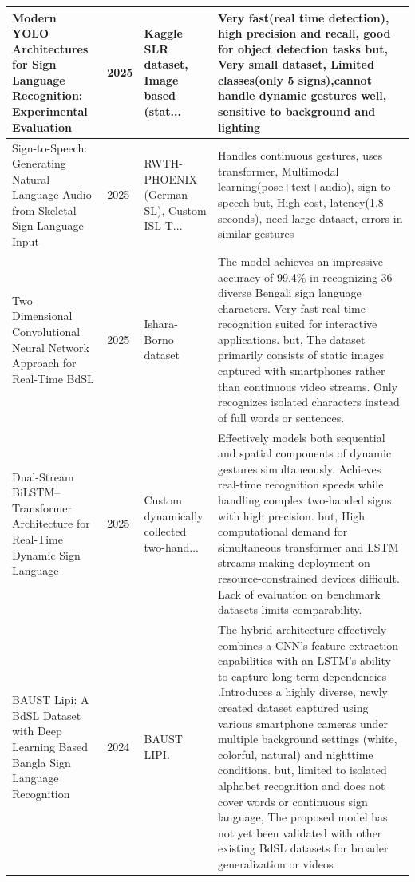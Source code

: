 \begin{longtable}{|p{4cm}|p{1cm}|p{3cm}|p{5.5cm}|}
Modern YOLO Architectures for Sign Language Recognition: Experimental Evaluation \cite{study_yolo_slr_2025} & 2025 & Kaggle SLR dataset, Image based (stat... & Very fast(real time detection), high precision and recall, good for object detection tasks but, Very small dataset, Limited classes(only 5 signs),cannot handle dynamic gestures well, sensitive to background and lighting \\ \hline
Sign-to-Speech: Generating Natural Language Audio from Skeletal Sign Language Input \cite{study_sign_to_speech_2025} & 2025 & RWTH-PHOENIX (German SL), Custom ISL-T... & Handles continuous gestures, uses transformer, Multimodal learning(pose+text+audio), sign to speech but, High cost, latency(1.8 seconds), need large dataset, errors in similar gestures \\ \hline
Two Dimensional Convolutional Neural Network Approach for Real-Time BdSL \cite{207} & 2025 & Ishara-Borno dataset & The model achieves an impressive accuracy of 99.4\% in recognizing 36 diverse Bengali sign language characters. Very fast real-time recognition suited for interactive applications. but, The dataset primarily consists of static images captured with smartphones rather than continuous video streams. Only recognizes isolated characters instead of full words or sentences. \\ \hline
Dual-Stream BiLSTM–Transformer Architecture for Real-Time Dynamic Sign Language \cite{study_dualstream_bilstm_2025} & 2025 & Custom dynamically collected two-hand... & Effectively models both sequential and spatial components of dynamic gestures simultaneously. Achieves real-time recognition speeds while handling complex two-handed signs with high precision. but, High computational demand for simultaneous transformer and LSTM streams making deployment on resource-constrained devices difficult. Lack of evaluation on benchmark datasets limits comparability. \\ \hline
BAUST Lipi: A BdSL Dataset with Deep Learning Based Bangla Sign Language Recognition \cite{study_baust_lipi_2024} & 2024 & BAUST LIPI. & The hybrid architecture effectively combines a CNN's feature extraction capabilities with an LSTM's ability to capture long-term dependencies .Introduces a highly diverse, newly created dataset captured using various smartphone cameras under multiple background settings (white, colorful, natural) and nighttime conditions. but, limited to isolated alphabet recognition and does not cover words or continuous sign language, The proposed model has not yet been validated with other existing BdSL datasets for broader generalization or videos \\ \hline

\end{longtable}

